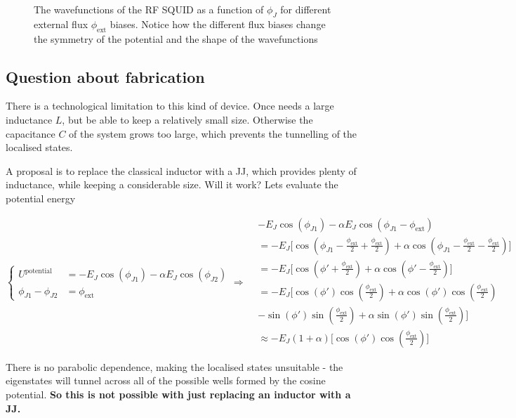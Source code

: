  \begin{figure}[h]
 	\caption{The wavefunctions of the RF SQUID as a function of $\phi_J$ for different external flux $\phi_\text{ext}$ biases. Notice how the different flux biases change the symmetry of the potential and the shape of the wavefunctions}
 	\label{fig:l3wavefun}
 \end{figure}

 	
 \newpage 

 \subsection{Question about fabrication}
 There is a technological limitation to this kind of device. Once needs a large inductance $L$, but be able to keep a relatively small size. Otherwise the capacitance $ C $ of the system grows too large, which prevents the tunnelling of the localised states.
 
 A proposal is to replace the classical inductor with a JJ, which provides plenty of inductance, while keeping a considerable size. Will it work? Lets evaluate the potential energy
 
 \begin{equation}
	\left\lbrace\begin{aligned}
 		U^{\text{potential}} & = -E_J\cos(\phi_{J1}) - \alpha E_J\cos(\phi_{J2})\\
 		\phi_{J1} - \phi_{J2} & = \phi_\text{ext}
	\end{aligned}\right. \Rightarrow
	\begin{aligned}
		&-E_J\cos(\phi_{J1}) - \alpha E_J\cos(\phi_{J1}-\phi_\text{ext})\\
		& = -E_J\bigg[\cos(\phi_{J1}-\frac{\phi_\text{ext}}{2}+\frac{\phi_\text{ext}}{2}) + \alpha\cos(\phi_{J1}-\frac{\phi_\text{ext}}{2}-\frac{\phi_\text{ext}}{2})\bigg]\\
		& = -E_J\bigg[\cos(\phi'+\frac{\phi_\text{ext}}{2}) + \alpha\cos(\phi'-\frac{\phi_\text{ext}}{2})\bigg]\\
		& = -E_J\bigg[\cos(\phi')\cos(\frac{\phi_\text{ext}}{2}) + \alpha\cos(\phi')\cos(\frac{\phi_\text{ext}}{2})\\
		& - \sin(\phi')\sin(\frac{\phi_\text{ext}}{2}) + \alpha\sin(\phi')\sin(\frac{\phi_\text{ext}}{2}) \bigg]\\
		& \approx -E_J(1+\alpha)\bigg[\cos(\phi')\cos(\frac{\phi_\text{ext}}{2})\bigg]
	\end{aligned}
 \end{equation}

 \noindent There is no parabolic dependence, making the localised states unsuitable - the eigenstates will tunnel across all of the possible wells formed by the cosine potential. \textbf{So this is not possible with just replacing an inductor with a JJ.}
  
  \newpage
